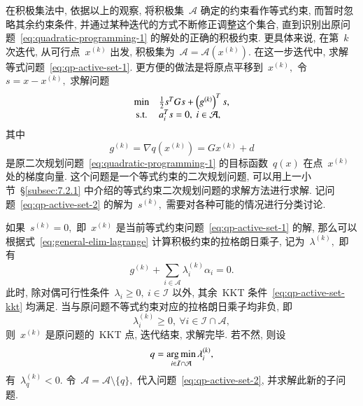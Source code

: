 在积极集法中, 依据以上的观察, 将积极集~$\mathcal{A}$ 确定的约束看作等式约束, 而暂时忽略其余约束条件, 并通过某种迭代的方式不断修正调整这个集合, 直到识别出原问题~\eqref{eq:quadratic-programming-1} 的解处的正确的积极约束. 更具体来说, 在第~$k$ 次迭代, 从可行点~${x}^{(k)}$ 出发,
积极集为~$\mathcal{A} = \mathcal{A}({x}^{(k)}).$ 在这一步迭代中,
求解等式问题~\eqref{eq:qp-active-set-1}. 更方便的做法是将原点平移到~${x}^{(k)},$ 令~${s} = {x} - {x}^{(k)},$ 求解问题
\begin{equation}
\label{eq:qp-active-set-2}
\begin{array}{cl}
\min & \frac{1}{2} {s}^T G {s} + \left( {g}^{(k)} \right)^T {s}, \\
{\rm s.t.} & {a}_i^T {s} = 0, ~ i \in \mathcal{A},
\end{array}
\end{equation}
其中
\begin{equation*}
{g}^{(k)} = \nabla q({x}^{(k)}) = G {x}^{(k)} + {d}
\end{equation*}
是原二次规划问题~\eqref{eq:quadratic-programming-1} 的目标函数~$q({x})$ 在点~${x}^{(k)}$ 处的梯度向量.  这个问题是一个等式约束的二次规划问题, 可以用上一小节~\S\ref{subsec:7.2.1} 中介绍的等式约束二次规划问题的求解方法进行求解. 记问题~\eqref{eq:qp-active-set-2} 的解为~${s}^{(k)},$ 需要对各种可能的情况进行分类讨论.

如果~${s}^{(k)} = {0},$ 即~${x}^{(k)}$ 是当前等式约束问题~\eqref{eq:qp-active-set-1} 的解, 那么可以根据式~\eqref{eq:general-elim-lagrange} 计算积极约束的拉格朗日乘子, 记为~${\lambda}^{(k)},$  即有
\begin{equation}
\label{eq:qp-active-set-lambda}
{g}^{(k)} + \sum\limits_{i \in \mathcal{A}} \lambda_i^{(k)} \alpha_i = 0.
\end{equation}
此时, 除对偶可行性条件~$\lambda_i \geqslant 0, ~ i \in \mathcal{I}$ 以外, 其余~KKT
条件~\eqref{eq:qp-active-set-kkt} 均满足. 当与原问题不等式约束对应的拉格朗日乘子均非负, 即
\begin{equation*}
\lambda_i^{(k)} \geqslant 0, ~ \forall i \in \mathcal{I} \cap \mathcal{A},
\end{equation*}
则~$x^{(k)}$ 是原问题的~KKT 点, 迭代结束, 求解完毕. 若不然, 则设
\begin{equation}
\label{eq:qp-active-set-inactive-index}
q = \operatorname*{arg\,min}_{i \in \mathcal{I} \cap \mathcal{A}} \lambda_i^{(k)},
\end{equation}
有~$\lambda_q^{(k)} < 0.$ 令~$\mathcal{A} = \mathcal{A} \setminus \{ q \},$
代入问题~\eqref{eq:qp-active-set-2}, 并求解此新的子问题.

